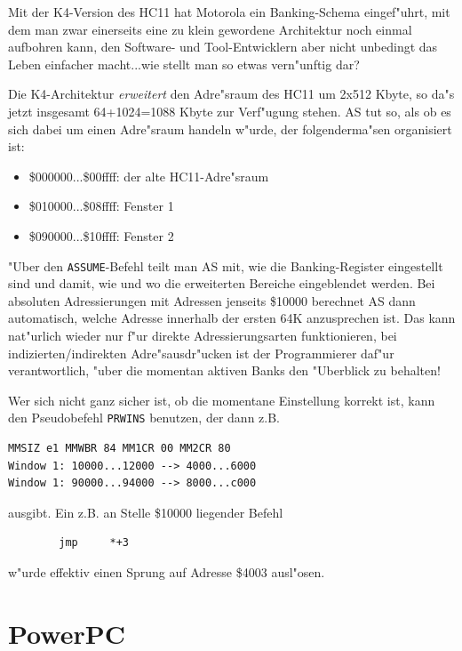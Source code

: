 \documentclass[12pt,a4paper,twoside]{report}
\newcommand{\asname}{AS}
\begin{document}
Mit der K4-Version des HC11 hat Motorola ein Banking-Schema eingef"uhrt,
mit dem man zwar einerseits eine zu klein gewordene Architektur noch
einmal aufbohren kann, den Software- und Tool-Entwicklern aber nicht
unbedingt das Leben einfacher macht...wie stellt man so etwas vern"unftig
dar?

Die K4-Architektur {\em erweitert} den Adre"sraum des HC11 um 2x512 Kbyte,
so da"s jetzt insgesamt 64+1024=1088 Kbyte zur Verf"ugung stehen.  \asname{} tut
so, als ob es sich dabei um einen Adre"sraum handeln w"urde, der
folgenderma"sen organisiert ist:
\begin{itemize}
\item{\$000000...\$00ffff: der alte HC11-Adre"sraum}
\item{\$010000...\$08ffff: Fenster 1}
\item{\$090000...\$10ffff: Fenster 2}
\end{itemize}
"Uber den {\tt ASSUME}-Befehl teilt man \asname{} mit, wie die Banking-Register
eingestellt sind und damit, wie und wo die erweiterten Bereiche
eingeblendet werden.  Bei absoluten Adressierungen mit Adressen jenseits
\$10000 berechnet \asname{} dann automatisch, welche Adresse innerhalb der ersten
64K anzusprechen ist.  Das kann nat"urlich wieder nur f"ur direkte
Adressierungsarten funktionieren, bei indizierten/indirekten
Adre"sausdr"ucken ist der Programmierer daf"ur verantwortlich, "uber die
momentan aktiven Banks den "Uberblick zu behalten!

Wer sich nicht ganz sicher ist, ob die momentane Einstellung korrekt ist,
kann den Pseudobefehl {\tt PRWINS} benutzen, der dann z.B.
\begin{verbatim}
MMSIZ e1 MMWBR 84 MM1CR 00 MM2CR 80
Window 1: 10000...12000 --> 4000...6000
Window 1: 90000...94000 --> 8000...c000
\end{verbatim}
ausgibt.  Ein z.B. an Stelle \$10000 liegender Befehl
\begin{verbatim}
        jmp     *+3
\end{verbatim}
w"urde effektiv einen Sprung auf Adresse \$4003 ausl"osen.


\section{PowerPC}
\end{document}
